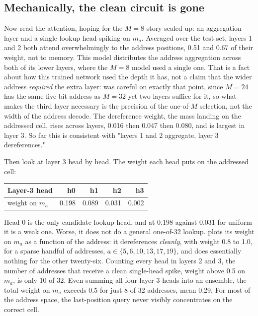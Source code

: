\subsection*{Mechanically, the clean circuit is gone}

Now read the attention, hoping for the $M = 8$ story scaled up: an aggregation
layer and a single lookup head spiking on $m_a$. Averaged over the test set,
layers 1 and 2 both attend overwhelmingly to the address positions, 0.51 and
0.67 of their weight, not to memory. This model distributes the address
aggregation across both of its lower layers, where the $M = 8$ model used a
single one. That is a fact about how this trained network used the depth it has,
not a claim that the wider address \emph{required} the extra layer:
 was careful on exactly that point, since $M = 24$ has the
same five-bit address as $M = 32$ yet two layers suffice for it, so what makes
the third layer necessary is the precision of the one-of-$M$ selection, not the
width of the address decode. The
dereference weight, the mass landing on the addressed cell, rises across layers,
0.016 then 0.047 then 0.080, and is largest in layer 3. So far this is
consistent with "layers 1 and 2 aggregate, layer 3 dereferences."

Then look at layer 3 head by head. The weight each head puts on the addressed
cell:

\begin{center}
\begin{tabular}{@{}lrrrr@{}}
\toprule
Layer-3 head & h0 & h1 & h2 & h3 \\
\midrule
weight on $m_a$ & 0.198 & 0.089 & 0.031 & 0.002 \\
\bottomrule
\end{tabular}
\end{center}

Head 0 is the only candidate lookup head, and at 0.198 against 0.031 for uniform
it is a weak one. Worse, it does not do a general one-of-32 lookup.
 plots its weight on $m_a$ as a function of the
address: it dereferences \emph{cleanly}, with weight 0.8 to 1.0, for a sparse
handful of addresses, $a \in \{5, 6, 10, 13, 17, 19\}$, and does essentially
nothing for the other twenty-six. Counting every head in layers 2 and 3, the
number of addresses that receive a clean single-head spike, weight above 0.5 on
$m_a$, is only 10 of 32. Even summing all four layer-3 heads into an ensemble,
the total weight on $m_a$ exceeds 0.5 for just 8 of 32 addresses, mean 0.29. For
most of the address space, the last-position query never visibly concentrates on
the correct cell.

